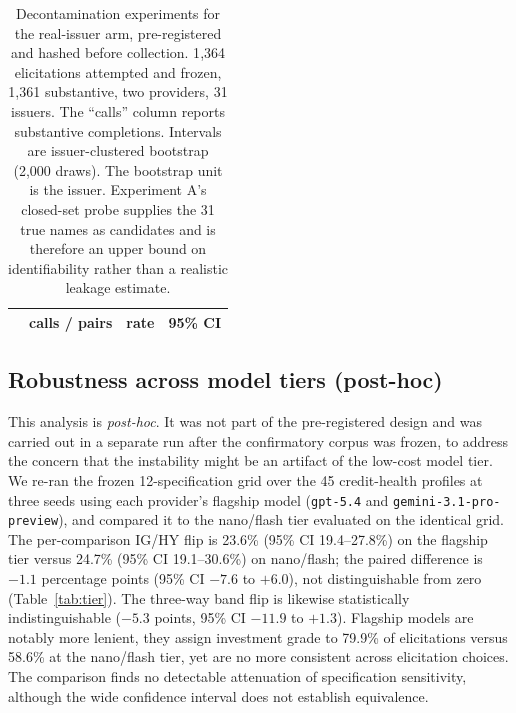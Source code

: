 \documentclass[a4paper,fleqn]{cas-sc}
\begin{document}
\begin{table}[t]\centering
\caption{Decontamination experiments for the real-issuer arm, pre-registered and hashed before
collection. 1{,}364 elicitations attempted and frozen, 1{,}361 substantive, two providers,
31 issuers. The ``calls'' column reports substantive completions. Intervals are issuer-clustered
bootstrap (2{,}000 draws). The bootstrap unit is the issuer. Experiment A's closed-set probe
supplies the 31 true names as candidates and is therefore an upper bound on identifiability rather
than a realistic leakage estimate.}
\label{tab:decontam}
\begin{tabular}{lccc}\toprule
 & calls / pairs & rate & 95\% CI \\\midrule%

\end{tabular}\end{table}

\subsection{Robustness across model tiers (post-hoc)}\label{sec:tier}
This analysis is \emph{post-hoc}. It was not part of the pre-registered design and was carried out in a
separate run after the confirmatory corpus was frozen, to address the
concern that the instability might be an artifact of the low-cost model tier. We re-ran the frozen
12-specification grid over the 45 credit-health profiles at three seeds using each provider's flagship
model (\texttt{gpt-5.4} and \texttt{gemini-3.1-pro-preview}), and compared it to the nano/flash tier
evaluated on the identical grid. The per-comparison IG/HY flip is 23.6\%
(95\% CI 19.4--27.8\%) on the flagship tier versus 24.7\% (95\% CI 19.1--30.6\%) on nano/flash; the
paired difference is $-1.1$ percentage points (95\% CI $-7.6$ to $+6.0$), not distinguishable from zero
(Table~\ref{tab:tier}). The three-way band flip is likewise statistically indistinguishable
($-5.3$ points, 95\% CI $-11.9$ to $+1.3$). Flagship models are notably more lenient, they assign
investment grade to 79.9\% of elicitations versus 58.6\% at the nano/flash tier, yet are no more
consistent across elicitation choices. The comparison finds no detectable attenuation of specification sensitivity, although the wide
confidence interval does not establish equivalence.
\end{document}

